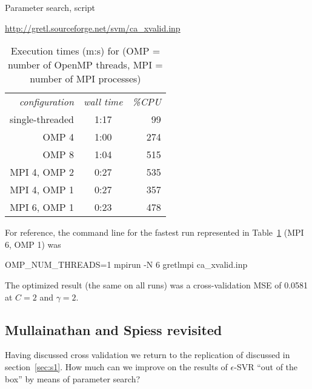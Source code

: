 \documentclass{article}
\begin{document}
\begin{script}[htbp]
  \caption{Parameter search, script }
  \label{listing:cadata}
  \begin{center}
    {\small
    \url{http://gretl.sourceforge.net/svm/ca_xvalid.inp}}
  \end{center}
\end{script}

\begin{table}[htbp]
\centering
\begin{tabular}{rcr}
\textit{configuration} & \textit{wall time} & \textit{\%CPU} \\
single-threaded & 1:17 & 99 \\
OMP 4 & 1:00 & 274 \\
OMP 8 & 1:04 & 515 \\
MPI 4, OMP 2 & 0:27 & 535 \\
MPI 4, OMP 1 & 0:27 & 357 \\
MPI 6, OMP 1 & 0:23 & 478
\end{tabular}
\caption{Execution times (m:s) for  (OMP =
  number of OpenMP threads, MPI = number of MPI processes)}
\label{tab:cadata}
\end{table}

For reference, the command line for the fastest run represented in
Table~\ref{tab:cadata} (MPI 6, OMP 1) was
\begin{code}
OMP_NUM_THREADS=1 mpirun -N 6 gretlmpi ca_xvalid.inp
\end{code}
The optimized result (the same on all runs) was a cross-validation MSE
of 0.0581 at $C=2$ and $$.


\subsection{Mullainathan and Spiess revisited}
\label{sec:ms-xvalid}

Having discussed cross validation we return to the replication of
\cite{mull-spiess17} discussed in section~\ref{sec:s1}. How much
can we improve on the results of $\epsilon$-SVR ``out of the
box'' by means of parameter search?
\end{document}

